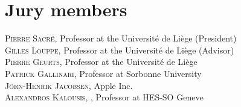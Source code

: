 
\chapter*{Jury members}


\noindent \textsc{Pierre Sacr{\'e}}, Professor at the Universit{\'e} de Li{\`e}ge (President) \\

\noindent \textsc{Gilles Louppe}, Professor at the Universit{\'e} de Li{\`e}ge (Advisor) \\

\noindent \textsc{Pierre Geurts}, Professor at the Universit{\'e} de Li{\`e}ge \\

\noindent \textsc{Patrick Gallinari}, Professor at Sorbonne University \\

\noindent \textsc{J{\"o}rn-Henrik Jacobsen}, Apple Inc. \\

\noindent \textsc{Alexandros Kalousis}, , Professor at HES-SO Geneve \\
